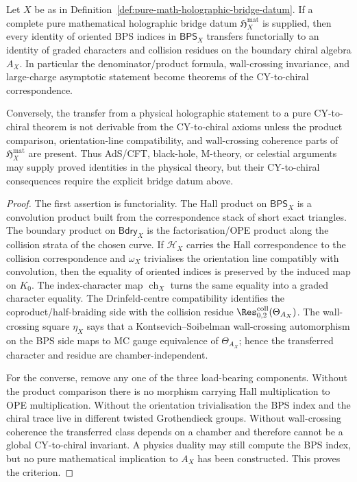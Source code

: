\begin{theorem}
\label{thm:holographic-bridge-criterion}
Let $X$ be as in Definition~\ref{def:pure-math-holographic-bridge-datum}.
If a complete pure mathematical holographic bridge datum
$\mathfrak H_X^{\mathrm{mat}}$ is supplied, then every identity of
oriented BPS indices in $\mathsf{BPS}_X$ transfers functorially to an
identity of graded characters and collision residues on the boundary
chiral algebra $A_X$. In particular the denominator/product formula,
wall-crossing invariance, and large-charge asymptotic statement become
theorems of the CY-to-chiral correspondence.

Conversely, the transfer from a physical holographic statement to a
pure CY-to-chiral theorem is not derivable from the CY-to-chiral axioms
unless the product comparison, orientation-line compatibility, and
wall-crossing coherence parts of
$\mathfrak H_X^{\mathrm{mat}}$ are present. Thus AdS/CFT, black-hole,
M-theory, or celestial arguments may supply proved identities in the
physical theory, but their CY-to-chiral consequences require the
explicit bridge datum above.
\end{theorem}

\begin{proof}
The first assertion is functoriality. The Hall product on
$\mathsf{BPS}_X$ is a convolution product built from the correspondence
stack of short exact triangles. The boundary product on
$\mathsf{Bdry}_X$ is the factorisation/OPE product along the collision
strata of the chosen curve. If $\mathcal H_X$ carries the Hall
correspondence to the collision correspondence and $\omega_X$ trivialises
the orientation line compatibly with convolution, then the equality of
oriented indices is preserved by the induced map on $K_0$. The
index-character map $\operatorname{ch}_X$ turns the same equality into a
graded character equality. The Drinfeld-centre compatibility identifies
the coproduct/half-braiding side with the collision residue
$\Res^{\mathrm{coll}}_{0,2}(\Theta_{A_X})$. The wall-crossing square
$\eta_X$ says that a Kontsevich--Soibelman wall-crossing automorphism on
the BPS side maps to MC gauge equivalence of $\Theta_{A_X}$; hence the
transferred character and residue are chamber-independent.

For the converse, remove any one of the three load-bearing components.
Without the product comparison there is no morphism carrying Hall
multiplication to OPE multiplication. Without the orientation
trivialisation the BPS index and the chiral trace live in different
twisted Grothendieck groups. Without wall-crossing coherence the
transferred class depends on a chamber and therefore cannot be a global
CY-to-chiral invariant. A physics duality may still compute the BPS
index, but no pure mathematical implication to $A_X$ has been
constructed. This proves the criterion.
\end{proof}

